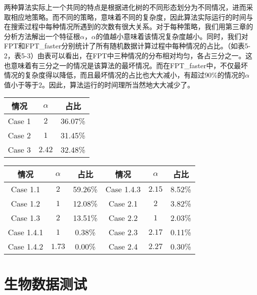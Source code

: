 
两种算法实际上一个共同的特点是根据进化树的不同形态划分为不同情况，进而采取相应地策略。而不同的策略，意味着不同的复杂度，因此算法实际运行的时间与在搜索过程中每种情况所遇到的次数有很大关系。对于每种策略，我们用第三章的分析方法解出一个特征根$\alpha$，$\alpha$的值越小意味着该情况复杂度越小。同时，我们对FPT和FPT\_faster分别统计了所有随机数据计算过程中每种情况的占比。（如表5-2，表5-3）由表可以看出，在FPT中三种情况的分布相对均匀，各占三分之一。这也意味着有三分之一的情况是该算法的最坏情况。而在FPT\_faster中，不仅最坏情况的复杂度得以降低，而且最坏情况的占比也大大减小，有超过90\%的情况的$\alpha$值小于等于$2$。因此，算法运行的时间理所当然地大大减少了。

\begin{center}
\begin{table}[htpb]
\parbox{.34\linewidth}{
\centering
{}
\begin{tabular}{ c c c}
	\hline
  		情况 & $\alpha$ & 占比\\  \hline
  		Case 1 & $2$ & 36.07\% \\
  		Case 2 & $1$ & 31.45\%\\
  		Case 3 & $2.42$ & 32.48\% \\
	\hline
\end{tabular}
}
\hfill
\parbox{.6\linewidth}{
\centering
{}
\begin{tabular}{ c c c | c c c }
	\hline
  		情况 & $\alpha$ & 占比 & 情况 & $\alpha$ & 占比\\  \hline
  		Case 1.1 & $2$ & 59.26\% & Case 1.4.3 & $2.15$ &8.52\%  \\
  		Case 1.2 & $1$ & 12.08\% & Case 2.1 & $2$ & 3.82\% \\
  		Case 1.3 & $2$ & 13.51\% & Case 2.2 & $1$ & 2.03\% \\
  		Case 1.4.1 & $1$ & 0.38\%  & Case 2.3 & $2.17$ & 0.11\% \\
  		Case 1.4.2 & $1.73$ & 0.00\% & Case 2.4 & $2.27$ & 0.30\% \\
	\hline
\end{tabular}
}
\end{table}
\end{center}


\section{生物数据测试}

